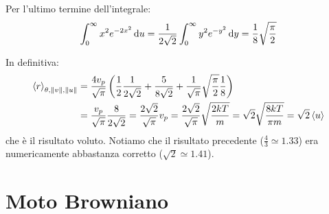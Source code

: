 Per l'ultimo termine dell'integrale:
\begin{equation}
	\int_0^\infty x^2 e^{-2x^2}\,\mathrm{d} u = \frac{1}{2\sqrt{2}}\int_0^\infty y^2 e^{-y^2}\,\mathrm{d} y = \frac{1}{8}\sqrt{\frac{\pi}{2}}
\end{equation}

In definitiva:
\begin{equation}
	\begin{aligned}
		\left<r\right>_{\theta,\left\lVert v\right\rVert,\left\lVert u\right\rVert} & = \frac{4v_p}{\sqrt{\pi}}\left(\frac{1}{2}\frac{1}{2\sqrt{2}}+\frac{5}{8\sqrt{2}}+\frac{1}{\sqrt{\pi}}\sqrt{\frac{\pi}{2}}\frac{1}{8}\right)                                            \\
		                                     & =\frac{v_p}{\sqrt{\pi}}\frac{8}{2\sqrt{2}}=\frac{2\sqrt{2}}{\sqrt{\pi}} v_p = \frac{2\sqrt{2}}{\sqrt{\pi}} \sqrt{\frac{2kT}{m}} = \sqrt{2} \sqrt{\frac{8kT}{\pi m}} = \sqrt{2}\left<u\right>
	\end{aligned}
\end{equation}
che è il risultato voluto. Notiamo che il risultato precedente ($\frac{4}{3}\simeq 1.33$) era numericamente abbastanza corretto ($\sqrt{2}\simeq 1.41$).








\section{Moto Browniano}

